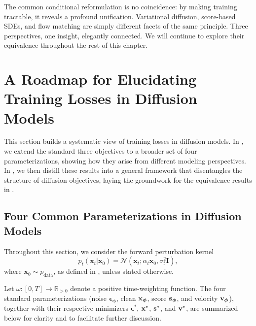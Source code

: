 The common conditional reformulation is no coincidence: by making training tractable, it reveals a profound unification. Variational diffusion, score-based SDEs, and flow matching are simply different facets of the same principle. Three perspectives, one insight, elegantly connected. We will continue to explore their equivalence throughout the rest of this chapter.

\newpage
\clearpage

\section{A Roadmap for Elucidating Training Losses in Diffusion Models
}\label{sec:elucidating}

This section builds a systematic view of training losses in diffusion models.  
In , we extend the standard three objectives to a broader set of four parameterizations, showing how they arise from different modeling perspectives.  
In , we then distill these results into a general framework that disentangles the structure of diffusion objectives, laying the groundwork for the equivalence results in .




\subsection{Four Common Parameterizations in Diffusion Models}\label{subsec:four-predictions}
Throughout this section, we consider the forward perturbation kernel
\[
p_t(\mathbf{x}_t|\mathbf{x}_0) = \mathcal{N}\left(\mathbf{x}_t; \alpha_t \mathbf{x}_0, \sigma_t^2 \mathbf{I} \right),
\]
where $\mathbf{x}_0 \sim p_{\mathrm{data}}$, as defined in , unless stated otherwise.



Let $\omega: [0, T] \to \mathbb{R}_{>0}$ denote a positive time-weighting function.  
The four standard parameterizations (noise $\bm{\epsilon}_{\bm{\phi}}$, clean ${\mathbf{x}}_{\bm{\phi}}$, score ${\mathbf{s}}_{\bm{\phi}}$, and velocity ${\mathbf{v}}_{\bm{\phi}}$), together with their respective minimizers $\bm{\epsilon}^*$, ${\mathbf{x}}^*$, ${\mathbf{s}}^*$, and ${\mathbf{v}}^*$, are summarized below for clarity and to facilitate further discussion.

